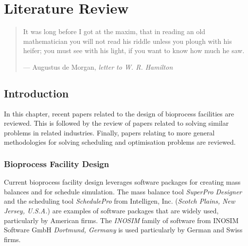 %
%
%
%

\chapter{Literature Review}\label{C.litreview}

\begin{quote}
It was long before I got at the maxim, that in reading an old mathematician you
will not read his riddle unless you plough with his heifer; you must see with
his light, if you want to know how much he saw.

\hspace{2cm}--- Augustus de Morgan, \emph{letter to W. R. Hamilton}
\end{quote}

\section{Introduction}\label{S.intro2}

In this chapter, recent papers related to the design of bioprocess facilities
are reviewed.  This is followed by the review of papers related to solving
similar problems in related industries.  Finally, papers relating to more
general methodologies for solving scheduling and optimisation problems are
reviewed.

\subsection{Bioprocess Facility Design}\label{SS.bioprocdes}

Current bioprocess facility design leverages software packages for creating mass
balances and for schedule simulation.  The mass balance tool
\emph{SuperPro Designer\textsuperscript{\textregistered}} 
and the scheduling tool \emph{SchedulePro\textsuperscript{\textregistered}}
from Intelligen, Inc. (\emph{Scotch Plains, New Jersey, U.S.A.}) are examples of
software packages that are widely used, particularly by American firms.
The \emph{INOSIM} family of software from INOSIM Software GmbH
\emph{Dortmund, Germany} is used particularly by German and Swiss firms.

